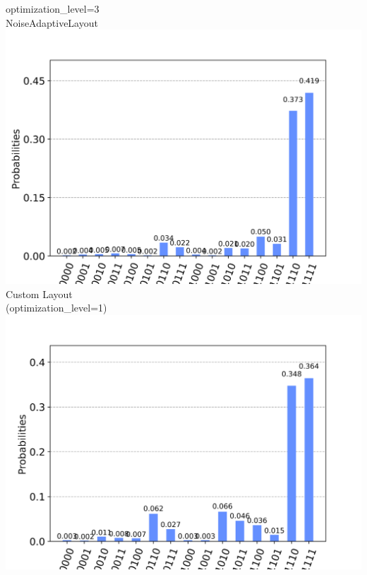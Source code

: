 \documentclass[aspectratio=169,11pt,hyperref={colorlinks=true}]{beamer}
\begin{document}
\begin{frame}
\begin{columns}
            \centering
            optimization\_level=3\\
            NoiseAdaptiveLayout\\
            \includegraphics[width=\linewidth, height=.4\textheight, keepaspectratio]{layout_3_results.png}\\
            Custom Layout\\
            (optimization\_level=1)\\
            \includegraphics[width=\linewidth, height=.4\textheight, keepaspectratio]{custom_layout_results.png}
    \end{columns}
\end{frame}
\end{document}
